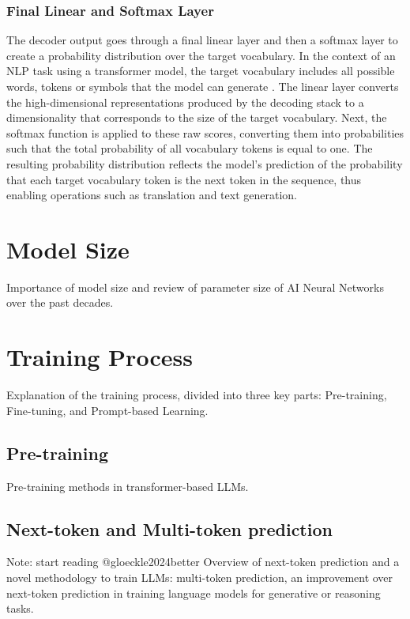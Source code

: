 \begin{itemize}
\subsubsection{Final Linear and Softmax Layer}

The decoder output goes through a final linear layer and then a softmax layer to create a probability distribution over the target vocabulary. In the context of an NLP task using a transformer model, the target vocabulary includes all possible words, tokens or symbols that the model can generate \cite{jozefowicz2016exploring}. The linear layer converts the high-dimensional representations produced by the decoding stack to a dimensionality that corresponds to the size of the target vocabulary. Next, the softmax function is applied to these raw scores, converting them into probabilities such that the total probability of all vocabulary tokens is equal to one. The resulting probability distribution reflects the model's prediction of the probability that each target vocabulary token is the next token in the sequence, thus enabling operations such as translation and text generation.

\newpage

\section{Model Size}
Importance of model size and review of parameter size of AI Neural Networks over the past decades.

\section{Training Process}
Explanation of the training process, divided into three key parts: Pre-training, Fine-tuning, and Prompt-based Learning.

\subsection{Pre-training}
Pre-training methods in transformer-based LLMs.

\subsection{Next-token and Multi-token prediction}
Note: start reading @gloeckle2024better \newline
Overview of next-token prediction and a novel methodology to train LLMs: multi-token prediction, an improvement over next-token prediction in training language models for generative or reasoning tasks. 


\end{itemize}

